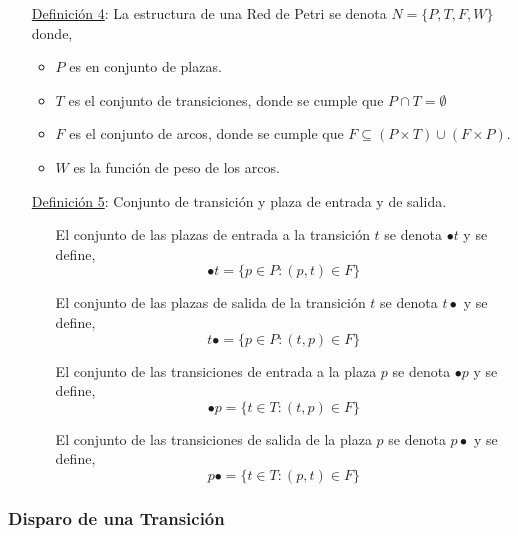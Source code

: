 \begin{itemize}
  En la figura \ref{fig:transiciones_no_sensibilizadas} se observa gráficamente esta definición mediante dos casos de transiciones no sensibilizadas. Nótese
  el peso de los arcos.

  \begin{figure}[h]
    \centering
    \texttt{[image: Transiciones\_No\_Sensibilizadas]}
    \caption{Ejemplos de transiciones no sensibilizadas.}
    \label{fig:transiciones_no_sensibilizadas}
  \end{figure}
  
  \item [\underline{Definición 4}:] La estructura de una Red de Petri
  se denota $ N = \{P, T, F, W\} $ donde,
  \begin{itemize}
    \item $P$ es en conjunto de plazas.
    \item $T$ es el conjunto de transiciones, donde se cumple que $ P \cap T =
    \emptyset $
    \item $F$ es el conjunto de arcos, donde se cumple que $ F \subseteq (P
    \times T) \cup (F \times P) $.
    \item $W$ es la función de peso de los arcos.
  \end{itemize}

  \item [\underline{Definición 5}:] Conjunto de transición y plaza de entrada y
  de salida.
  \begin{itemize}
    \item[] El conjunto de las plazas de entrada a la transición $t$ se denota
    $\bullet t$ y se define,
    $$ \bullet t = \{ p \in P : (p, t) \in F \} $$
    \item[] El conjunto de las plazas de salida de la transición $t$ se denota $
    t \bullet$ y se define,
    $$ t \bullet = \{ p \in P : (t, p) \in F \} $$
    \item[] El conjunto de las transiciones de entrada a la plaza $p$ se
    denota $\bullet p$ y se define,
    $$ \bullet p = \{ t \in T : (t, p) \in F \} $$
    \item[] El conjunto de las transiciones de salida de la plaza $p$ se denota
    $ p \bullet$ y se define,
    $$ p \bullet = \{ t \in T : (p, t) \in F \} $$
  \end{itemize}
\end{itemize}

\subsubsection{Disparo de una Transición}

